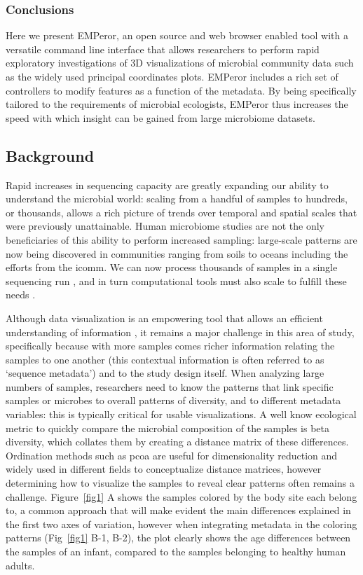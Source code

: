 \subsubsection{Conclusions}

Here we present EMPeror, an open source and web browser enabled tool with a versatile command line interface that allows researchers to perform rapid exploratory investigations of 3D visualizations of microbial community data such as the widely used principal coordinates plots. EMPeror includes a rich set of controllers to modify features as a function of the metadata. By being specifically tailored to the requirements of microbial ecologists, EMPeror thus increases the speed with which insight can be gained from large microbiome datasets.

\subsection{Background}

Rapid increases in sequencing capacity are greatly expanding our ability to understand the microbial world: scaling from a handful of samples to hundreds, or thousands, allows a rich picture of trends over temporal and spatial scales that were previously unattainable. Human microbiome studies are not the only beneficiaries of this ability to perform increased sampling: large-scale patterns are now being discovered in communities ranging from soils \cite{RN108} to oceans \cite{RN115} including the efforts from the \gls{icomm}.  We can now process thousands of samples in a single sequencing run \cite{RN85}, and in turn computational tools must also scale to fulfill these needs \cite{RN53}.

Although data visualization is an empowering tool that allows an efficient understanding of information \cite{RN126}, it remains a major challenge in this area of study, specifically because with more samples comes richer information relating the samples to one another (this contextual information is often referred to as `sequence metadata') and to the study design itself. When analyzing large numbers of samples, researchers need to know the patterns that link specific samples or microbes to overall patterns of diversity, and to different metadata variables: this is typically critical for usable visualizations. A well know ecological metric to quickly compare the microbial composition of the samples is beta diversity, which collates them by creating a distance matrix of these differences. Ordination methods such as \gls{pcoa} \cite{RN109} are useful for dimensionality reduction and widely used in different fields to conceptualize distance matrices, however determining how to visualize the samples to reveal clear patterns often remains a challenge. Figure~\ref{fig1} A shows the samples colored by the body site each belong to, a common approach that will make evident the main differences explained in the first two axes of variation, however when integrating metadata in the coloring patterns  (Fig~\ref{fig1} B-1, B-2), the plot clearly shows the age differences between the samples of an infant, compared to the samples belonging to healthy human adults.

